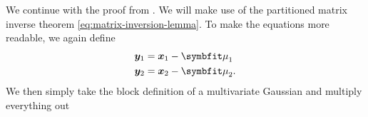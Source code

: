



We continue with the proof from \cite{murphy2012machine}. We will make use of
the partitioned matrix inverse theorem \autoref{eq:matrix-inversion-lemma}.
To make the equations more
readable, we again define
\begin{align}
    \vy_1 &= \vx_1 - \vmu_1 \\
    \vy_2 &= \vx_2 - \vmu_2.
\end{align}
We then simply take the block definition of a multivariate Gaussian and
multiply everything out

